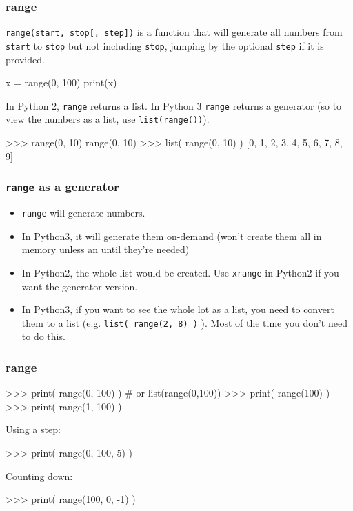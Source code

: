 \documentclass{beamer}
\begin{document}
\begin{frame}[fragile]
\frametitle{range}
\texttt{range(start, stop[, step])} is a function that will generate all
numbers from \texttt{start} to \texttt{stop} but not including
\texttt{stop}, jumping by the optional \texttt{step} if it is provided.
 
\begin{code}
x = range(0, 100)
print(x)
\end{code}

In Python 2, \texttt{range} returns a list. In Python 3 \texttt{range} returns a
generator (so to view the numbers as a list, use \texttt{list(range())}).

\begin{code}
>>> range(0, 10)
range(0, 10)
>>> list( range(0, 10) )
[0, 1, 2, 3, 4, 5, 6, 7, 8, 9]
\end{code}
\end{frame}


\begin{frame}
\frametitle{\texttt{range} as a generator}
\begin{itemize}
\item \texttt{range} will generate numbers. 
\item In Python3, it will generate them on-demand (won't create them all
in memory unless an until they're needed)
\item In Python2, the whole list would be created. Use \texttt{xrange} in
  Python2 if you want the generator version.
\item In Python3, if you want to see the whole lot as a list, you need
  to convert them to a list (e.g. \texttt{list( range(2, 8) )} ). Most of the
  time you don't need to do this.
\end{itemize} 
\end{frame}




\begin{frame}[fragile]
\frametitle{range}

\begin{code}
>>> print( range(0, 100) )  # or list(range(0,100))
>>> print( range(100) )
>>> print( range(1, 100) )
\end{code}
Using a step:
\begin{code}
>>> print( range(0, 100, 5) )
\end{code}
Counting down:
\begin{code}
>>> print( range(100, 0, -1) )
\end{code}
\end{frame}
\end{document}
